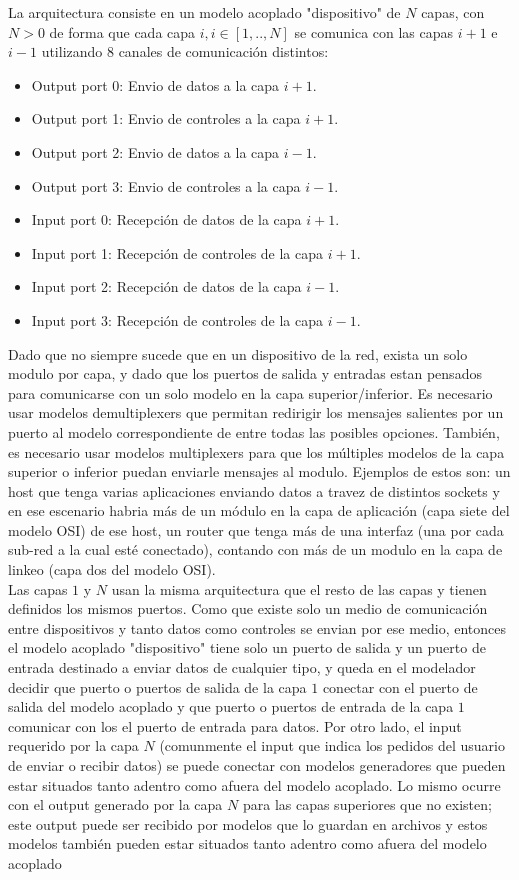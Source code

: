 \documentclass[10pt,a4paper]{article}
\begin{document}
La arquitectura consiste en un modelo acoplado "dispositivo" de $N$ capas, con $N > 0$ de forma que cada capa $i, i \in [1,..,N]$ se comunica con las capas $i+1$ e $i-1$ utilizando $8$ canales de comunicación distintos:

\begin{itemize}
\item Output port 0: Envio de datos a la capa $i+1$.
\item Output port 1: Envio de controles a la capa $i+1$.
\item Output port 2: Envio de datos a la capa $i-1$.
\item Output port 3: Envio de controles a la capa $i-1$.
\item Input port 0: Recepción de datos de la capa $i+1$.
\item Input port 1: Recepción de controles de la capa $i+1$.
\item Input port 2: Recepción de datos de la capa $i-1$.
\item Input port 3: Recepción de controles de la capa $i-1$.
\end{itemize}

Dado que no siempre sucede que en un dispositivo de la red, exista un solo modulo por capa, y dado que los puertos de salida y entradas estan pensados para comunicarse con un solo modelo en la capa superior/inferior. Es necesario usar modelos demultiplexers que permitan redirigir los mensajes salientes por un puerto al modelo correspondiente de entre todas las posibles opciones. También, es necesario usar modelos multiplexers para que los múltiples modelos de la capa superior o inferior puedan enviarle mensajes al modulo. Ejemplos de estos son: un host que tenga varias aplicaciones enviando datos a travez de distintos sockets y en ese escenario habria más de un módulo en la capa de aplicación (capa siete del modelo OSI) de ese host, un router  que tenga más de una interfaz (una por cada sub-red a la cual esté conectado), contando con más de un modulo en la capa de linkeo (capa dos del modelo OSI). \\

Las capas $1$ y $N$ usan la misma arquitectura que el resto de las capas y tienen definidos los mismos puertos. Como que existe solo un medio de comunicación entre dispositivos y tanto datos como controles se envian por ese medio, entonces el modelo acoplado "dispositivo" tiene solo un puerto de salida y un puerto de entrada destinado a enviar datos de cualquier tipo, y queda en el modelador decidir que puerto o puertos de salida de la capa $1$ conectar con el puerto de salida del modelo acoplado y que puerto o puertos de entrada de la capa $1$ comunicar con los el puerto de entrada para datos. Por otro lado, el input requerido por la capa $N$ (comunmente el input que indica los pedidos del usuario de enviar o recibir datos) se puede conectar con modelos generadores que pueden estar situados tanto adentro como afuera del modelo acoplado. Lo mismo ocurre con el output generado por la capa $N$ para las capas superiores que no existen; este output puede ser recibido por modelos que lo guardan en archivos y estos modelos también pueden estar situados tanto adentro como afuera del modelo acoplado \\
\end{document}
